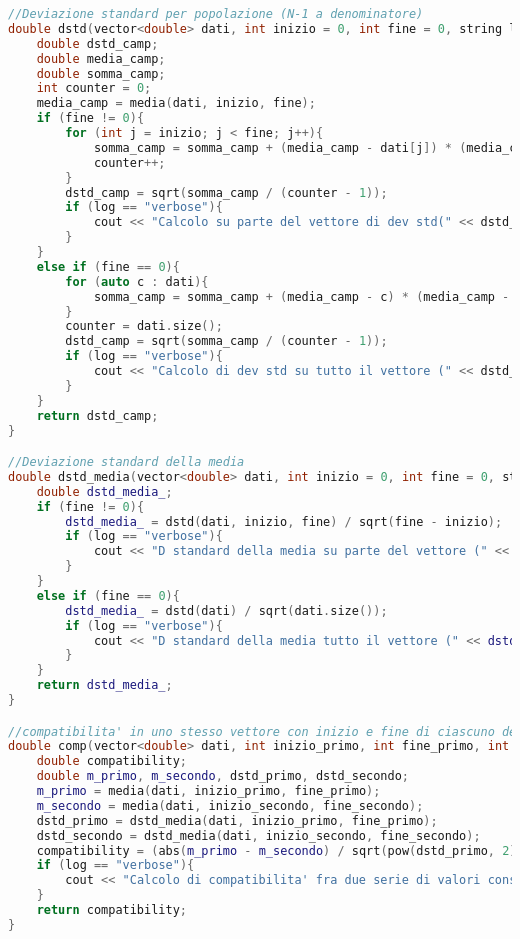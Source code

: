 \documentclass[a4paper,11pt,oneside]{article}
\begin{document}
\begin{lstlisting}[language=C++, label=lst:statistica.h, caption=statistica.h]
//Deviazione standard per popolazione (N-1 a denominatore)
double dstd(vector<double> dati, int inizio = 0, int fine = 0, string log = ""){
    double dstd_camp;
    double media_camp;
    double somma_camp;
    int counter = 0;
    media_camp = media(dati, inizio, fine);
    if (fine != 0){
        for (int j = inizio; j < fine; j++){
            somma_camp = somma_camp + (media_camp - dati[j]) * (media_camp - dati[j]);
            counter++;
        }
        dstd_camp = sqrt(somma_camp / (counter - 1));
        if (log == "verbose"){
            cout << "Calcolo su parte del vettore di dev std(" << dstd_camp << ")" << endl;
        }
    }
    else if (fine == 0){
        for (auto c : dati){
            somma_camp = somma_camp + (media_camp - c) * (media_camp - c);
        }
        counter = dati.size();
        dstd_camp = sqrt(somma_camp / (counter - 1));
        if (log == "verbose"){
            cout << "Calcolo di dev std su tutto il vettore (" << dstd_camp << ")" << endl;
        }
    }
    return dstd_camp;
}

//Deviazione standard della media
double dstd_media(vector<double> dati, int inizio = 0, int fine = 0, string log = ""){
    double dstd_media_;
    if (fine != 0){
        dstd_media_ = dstd(dati, inizio, fine) / sqrt(fine - inizio);
        if (log == "verbose"){
            cout << "D standard della media su parte del vettore (" << dstd_media_ << ")" << endl;
        }
    }
    else if (fine == 0){
        dstd_media_ = dstd(dati) / sqrt(dati.size());
        if (log == "verbose"){
            cout << "D standard della media tutto il vettore (" << dstd_media_ << ")" << endl;
        }
    }
    return dstd_media_;
}

//compatibilita' in uno stesso vettore con inizio e fine di ciascuno dei due intervalli
double comp(vector<double> dati, int inizio_primo, int fine_primo, int inizio_secondo, int fine_secondo, string log = ""){
    double compatibility;
    double m_primo, m_secondo, dstd_primo, dstd_secondo;
    m_primo = media(dati, inizio_primo, fine_primo);
    m_secondo = media(dati, inizio_secondo, fine_secondo);
    dstd_primo = dstd_media(dati, inizio_primo, fine_primo);
    dstd_secondo = dstd_media(dati, inizio_secondo, fine_secondo);
    compatibility = (abs(m_primo - m_secondo) / sqrt(pow(dstd_primo, 2) + pow(dstd_secondo, 2)));
    if (log == "verbose"){
        cout << "Calcolo di compatibilita' fra due serie di valori consecutivi nel vettore (" << compatibility << ") ATTENZIONE CHE QUI SI DEVE USARE LA SIGMA RIFERITA ALLA MISURA" << endl;
    }
    return compatibility;
}


\end{lstlisting}
\end{document}

